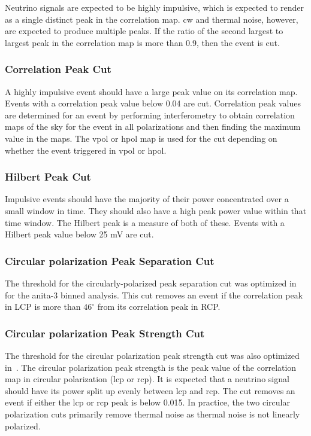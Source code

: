 Neutrino signals are expected to be highly impulsive, which is expected to render as a single distinct peak in the correlation map. \gls{cw} and thermal noise, however, are expected to produce multiple peaks. If the ratio of the second largest to largest peak in the correlation map is more than 0.9, then the event is cut. 

\subsubsection{Correlation Peak Cut}

A highly impulsive event should have a large peak value on its correlation map. Events with a correlation peak value below 0.04 are cut. Correlation peak values are determined for an event by performing interferometry to obtain correlation maps of the sky for the event in all polarizations and then finding the maximum value in the maps. The \gls{vpol} or \gls{hpol} map is used for the cut depending on whether the event triggered in \gls{vpol} or \gls{hpol}. 

\subsubsection{Hilbert Peak Cut}

Impulsive events should have the majority of their power concentrated over a small window in time. They should also have a high peak power value within that time window.  The Hilbert peak is a measure of both of these.  Events with a Hilbert peak value below 25 mV are cut. 

\subsubsection{Circular polarization Peak Separation Cut}

The threshold for the circularly-polarized peak separation cut was optimized in~\cite{samStaffordThesis} 
for the \gls{anita}-3 binned analysis.  This cut removes an event if the correlation peak in LCP is more than $46^{\circ}$ from its correlation peak in RCP.

\subsubsection{Circular polarization Peak Strength Cut}

The threshold for the circular polarization peak strength cut was also optimized in~\cite{samStaffordThesis}. The circular polarization peak strength is the peak value of the correlation map in circular polarization (\gls{lcp} or \gls{rcp}). It is expected that a neutrino signal should have its power split up evenly between \gls{lcp} and \gls{rcp}.  The cut removes an event if either the \gls{lcp} or \gls{rcp} peak is below 0.015.  In practice, the two circular polarization cuts primarily remove thermal noise as thermal noise is not linearly polarized. 

